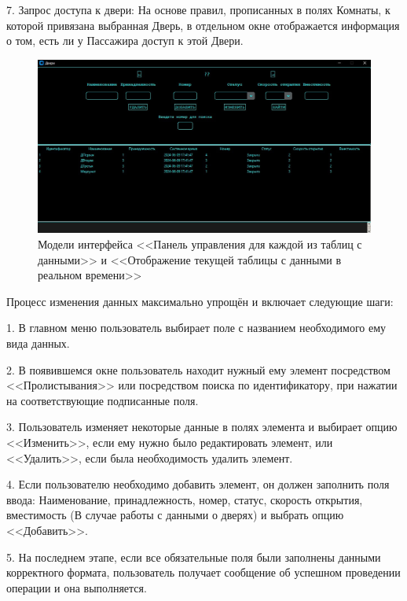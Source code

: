 7. Запрос доступа к двери: На основе правил, прописанных в полях Комнаты, к которой привязана выбранная Дверь, в отдельном окне отображается информация о том, есть ли у Пассажира доступ к этой Двери.

\begin{figure} [ht]
	\centering
	\includegraphics[width=1.05\linewidth]{images/Example2}
	\caption{Модели интерфейса <<Панель управления для каждой из таблиц с данными>> и <<Отображение текущей таблицы с данными в реальном времени>>}
	\label{fig:example2}
\end{figure}

Процесс изменения данных максимально упрощён и включает следующие шаги:

1. В главном меню пользователь выбирает поле с названием необходимого ему вида данных.

2. В появившемся окне пользователь находит нужный ему элемент посредством <<Пролистывания>> или посредством поиска по идентификатору, при нажатии на соответствующие подписанные поля.

3. Пользователь изменяет некоторые данные в полях элемента и выбирает опцию <<Изменить>>, если ему нужно было редактировать элемент, или <<Удалить>>, если была необходимость удалить элемент.

4. Если пользователю необходимо добавить элемент, он должен заполнить поля ввода: Наименование, принадлежность, номер, статус, скорость открытия, вместимость (В случае работы с данными о дверях) и выбрать опцию <<Добавить>>.

5. На последнем этапе, если все обязательные поля были заполнены данными корректного формата, пользователь получает сообщение об успешном проведении операции и она выполняется.

